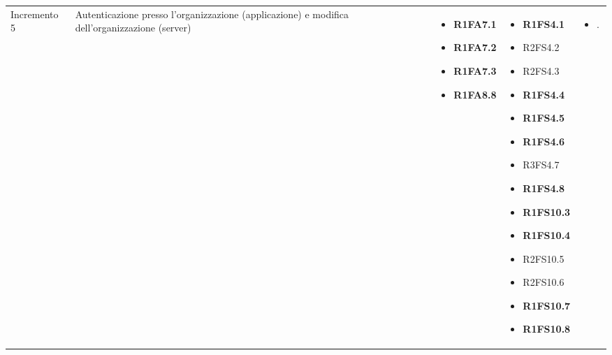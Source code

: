 {\begin{longtable}{C{2.5cm} C{3.2cm} C{2.8cm} C{2.8cm} C{2.8cm}}
Incremento 5 & Autenticazione presso l'organizzazione (applicazione) e modifica dell'organizzazione (server) & \begin{itemize}
    \item[ ] \textbf{R1FA7.1}
    \item[ ] \textbf{R1FA7.2}
    \item[ ] \textbf{R1FA7.3}
    \item[ ] \textbf{R1FA8.8}
\end{itemize} & \begin{itemize} 
    \item[ ] \textbf{R1FS4.1}
    \item[ ] R2FS4.2
    \item[ ] R2FS4.3
    \item[ ] \textbf{R1FS4.4}
    \item[ ] \textbf{R1FS4.5}
    \item[ ] \textbf{R1FS4.6}
    \item[ ] R3FS4.7
    \item[ ] \textbf{R1FS4.8}
    \item[ ] \textbf{R1FS10.3}
    \item[ ] \textbf{R1FS10.4}
    \item[ ] R2FS10.5
    \item[ ] R2FS10.6
    \item[ ] \textbf{R1FS10.7}
    \item[ ] \textbf{R1FS10.8}
\end{itemize} & \begin{itemize} 
    \item[ ] .
\end{itemize}\\


\end{longtable}}

